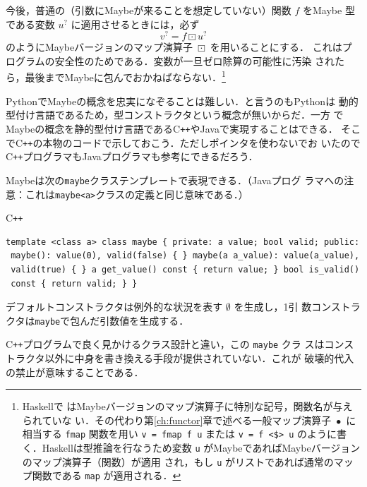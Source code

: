 \documentclass[a5paper,twoside,fleqn]{jsbook}
\newcommand{\programminglanguage}[1]{\textsf{#1}}
\newcommand{\cxx}{\programminglanguage{C}\texttt{++}}
\newcommand{\haskell}{\programminglanguage{Haskell}}
\newcommand{\java}{\programminglanguage{Java}}
\newcommand{\python}{\programminglanguage{Python}}
\newcommand{\code}[1]{\texttt{#1}}
\newenvironment{cxxcode}{\begin{itembox}[r]{\cxx}}{\end{itembox}}
\newcommand{\mNothing}{\emptyset}
\DeclareMathOperator{\mMap}{\bullet}
\DeclareMathOperator{\mMapMaybe}{\boxdot}
\newcommand{\mMaybe}[1]{{#1}^?}
\begin{document}
今後，普通の（引数にMaybeが来ることを想定していない）関数 $f$ をMaybe
型である変数 $\mMaybe{u}$ に適用させるときには，必ず
\begin{equation}
\mMaybe{v}=f\mMapMaybe\mMaybe{u}
\end{equation}
のようにMaybeバージョンのマップ演算子 $\mMapMaybe$ を用いることにする．
これはプログラムの安全性のためである．変数が一旦ゼロ除算の可能性に汚染
されたら，最後までMaybeに包んでおかねばならない．\footnote{\haskell で
  はMaybeバージョンのマップ演算子に特別な記号，関数名が与えられていな
  い．その代わり第\ref{ch:functor}章で述べる一般マップ演算子 $\mMap$
  に相当する \code{fmap} 関数を用い \code{v = fmap f u} または \code{v
    = f <\$> u} のように書く．\haskell は型推論を行なうため変数
  \code{u} がMaybeであればMaybeバージョンのマップ演算子（関数）が適用
  され，もし \code{u} がリストであれば通常のマップ関数である
  \code{map} が適用される．}

\python でMaybeの概念を忠実になぞることは難しい．と言うのも\python は
動的型付け言語であるため，型コンストラクタという概念が無いからだ．一方
でMaybeの概念を静的型付け言語である\cxx や\java で実現することはできる．
そこで\cxx の本物のコードで示しておこう．ただしポインタを使わないでお
いたので\cxx プログラマも\java プログラマも参考にできるだろう．

Maybeは次の\code{maybe}クラステンプレートで表現できる．（\java プログ
  ラマへの注意：これは\code{maybe<a>}クラスの定義と同じ意味である．）
\begin{cxxcode}
\begin{verbatim}
template <class a> class maybe { private: a value; bool valid; public:
 maybe(): value(0), valid(false) { } maybe(a a_value): value(a_value),
 valid(true) { } a get_value() const { return value; } bool is_valid()
 const { return valid; } }
\end{verbatim}
\end{cxxcode}
デフォルトコンストラクタは例外的な状況を表す $\mNothing$ を生成し，1引
数コンストラクタは\code{maybe}で包んだ引数値を生成する．

\cxx プログラムで良く見かけるクラス設計と違い，この \code{maybe} クラ
スはコンストラクタ以外に中身を書き換える手段が提供されていない．これが
破壊的代入の禁止が意味することである．
\end{document}
